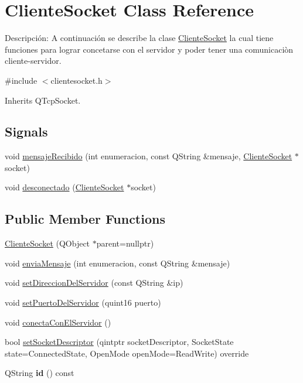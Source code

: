 \hypertarget{class_cliente_socket}{}\section{Cliente\+Socket Class Reference}
\label{class_cliente_socket}


Descripción\+: A continuación se describe la clase \hyperlink{class_cliente_socket}{Cliente\+Socket} la cual tiene funciones para lograr concetarse con el servidor y poder tener una comunicaciòn cliente-\/servidor.  




{\ttfamily \#include $<$clientesocket.\+h$>$}



Inherits Q\+Tcp\+Socket.

\subsection*{Signals}
\begin{DoxyCompactItemize}
\item 
void \hyperlink{class_cliente_socket_a85bb0acefb353f0cd8ab799e8837031c}{mensaje\+Recibido} (int enumeracion, const Q\+String \&mensaje, \hyperlink{class_cliente_socket}{Cliente\+Socket} $\ast$socket)
\item 
void \hyperlink{class_cliente_socket_a9b3fe9b9c512e91b90c8aa86b4ee14e9}{desconectado} (\hyperlink{class_cliente_socket}{Cliente\+Socket} $\ast$socket)
\end{DoxyCompactItemize}
\subsection*{Public Member Functions}
\begin{DoxyCompactItemize}
\item 
\hyperlink{class_cliente_socket_a92a124ca5c40e83cf640bd3c845af6ca}{Cliente\+Socket} (Q\+Object $\ast$parent=nullptr)
\item 
void \hyperlink{class_cliente_socket_ad176a3962afc92f60da91d2526bcf569}{envia\+Mensaje} (int enumeracion, const Q\+String \&mensaje)
\item 
void \hyperlink{class_cliente_socket_a2ed30e026ad1252c8ad07fd437cf4cc4}{set\+Direccion\+Del\+Servidor} (const Q\+String \&ip)
\item 
void \hyperlink{class_cliente_socket_ad5b33460d9575854b5617d2a6e467231}{set\+Puerto\+Del\+Servidor} (quint16 puerto)
\item 
void \hyperlink{class_cliente_socket_a8cb382178c3e572188c61af72355f174}{conecta\+Con\+El\+Servidor} ()
\item 
bool \hyperlink{class_cliente_socket_af8e9fa96a8f3a2207f34b26c74d53de9}{set\+Socket\+Descriptor} (qintptr socket\+Descriptor, Socket\+State state=Connected\+State, Open\+Mode open\+Mode=Read\+Write) override
\item 
\mbox{\label{class_cliente_socket_aa40872ba7f52bc1047e2012a6f824bcb}} 
Q\+String {\bfseries id} () const
\end{DoxyCompactItemize}



